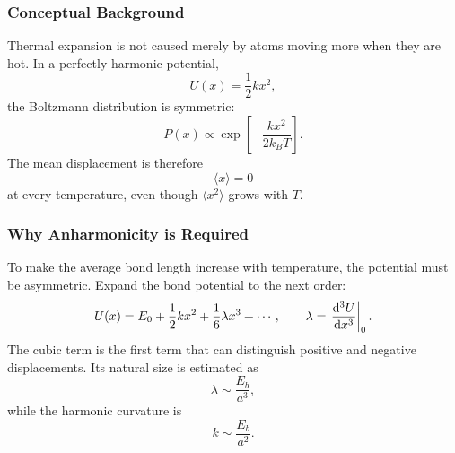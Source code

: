 \subsubsection*{Conceptual Background}
Thermal expansion is not caused merely by atoms moving more when they are hot.
In a perfectly harmonic potential,
\begin{equation}
    U(x)=\frac{1}{2}kx^2,
    \label{eq:lec11:harmonic-potential}
\end{equation}
the Boltzmann distribution is symmetric:
\begin{equation}
    P(x)\propto \exp\left[-\frac{kx^2}{2k_BT}\right].
    \label{eq:lec11:boltzmann-harmonic}
\end{equation}
The mean displacement is therefore
\begin{equation}
    \langle x\rangle =0
    \label{eq:lec11:harmonic-mean}
\end{equation}
at every temperature, even though $\langle x^2\rangle$ grows with $T$.

\subsubsection*{Why Anharmonicity is Required}
To make the average bond length increase with temperature, the potential must
be asymmetric. Expand the bond potential to the next order:
\begin{equation}
    U(x)=E_0+\frac{1}{2}kx^2+\frac{1}{6}\lambda x^3+\cdots,
    \qquad
    \lambda=\left.\dv[3]{U}{x}\right|_0 .
    \label{eq:lec11:anharmonic}
\end{equation}
The cubic term is the first term that can distinguish positive and negative
displacements. Its natural size is estimated as
\begin{equation}
    \lambda\sim \frac{E_b}{a^3},
    \label{eq:lec11:cubic-scale}
\end{equation}
while the harmonic curvature is
\begin{equation}
    k\sim\frac{E_b}{a^2}.
    \label{eq:lec11:k-scale}
\end{equation}


